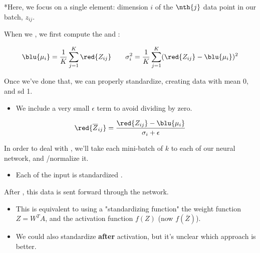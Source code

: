             \begin{kequation}
                *Here, we focus on a single element: dimension $i$ of the $\nth{j}$ data point in our batch, $z_{ij}$.
            
                When we , we first compute the  and :

                \begin{equation*}
                        \blu{\mu_i} =\frac{1}{K} \sum_{j=1}^K \red{Z_{ij}}
                        \qquad
                        \sigma^2_i = \frac{1}{K} \sum_{j=1}^K (\red{Z_{ij}}-\blu{\mu_i})^2 
                    \end{equation*}

                Once we've done that, we can properly standardize, creating data with mean 0, and sd 1.

                \begin{itemize}
                    \item We include a very small $\epsilon$ term to avoid dividing by zero.
                \end{itemize}

                \begin{equation*}
                        \red{ \overline{Z}_{ij} } =  \frac{ \red{Z_{ij}}  -\blu{\mu_i}}{\sigma_i+\epsilon}
                    \end{equation*}
                
            \end{kequation}

            \begin{concept}
                In order to deal with , we'll take each mini-batch of $k$  to each  of our neural network, and /normalize it.

                \begin{itemize}
                    \item Each  of the input is standardized .
                \end{itemize}

                After , this data is sent forward through the network.

                \begin{itemize}
                    \item This is equivalent to using a "standardizing function"  the weight function $Z=W^TA$, and  the activation function $f(Z)$ (now $f(\overline{Z})$).
                    \item We could also standardize \textbf{after} activation, but it's unclear which approach is better.
                \end{itemize}
                
            \end{concept}

